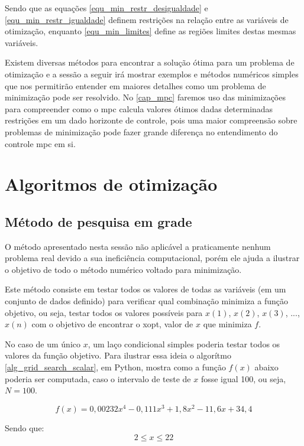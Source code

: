 Sendo que as equações \ref{equ_min_restr_desigualdade} e \ref{equ_min_restr_igualdade} definem restrições na relação entre as variáveis de otimização, enquanto \ref{equ_min_limites} define as regiões limites destas mesmas variáveis.

Existem diversas métodos para encontrar a solução ótima para um problema de otimização e a sessão a seguir irá mostrar exemplos e métodos numéricos simples que nos permitirão entender em maiores detalhes como um problema de minimização pode ser resolvido. No \autoref{cap_mpc} faremos uso das minimizações para compreender como o \acrshort{mpc} calcula valores ótimos dadas determinadas restrições em um dado horizonte de controle, pois uma maior compreensão sobre problemas de minimização pode fazer grande diferença no entendimento do controle \acrshort{mpc} em si.

\section{Algoritmos de otimização}

\subsection{Método de pesquisa em grade}

O método apresentado nesta sessão não aplicável a praticamente nenhum problema real devido a sua ineficiência computacional, porém ele ajuda a ilustrar o objetivo de todo o método numérico voltado para minimização.

Este método consiste em testar todos os valores de todas as variáveis (em um conjunto de dados definido) para verificar qual combinação minimiza a função objetivo, ou seja, testar todos os valores possíveis para $x(1)$, $x(2)$, $x(3)$, $...$, $x(n)$ com o objetivo de encontrar o \gls{xopt}, valor de $x$ que minimiza $f$.

No caso de um único $x$, um laço condicional simples poderia testar todos os valores da função objetivo. Para ilustrar essa ideia o algorítmo \ref{alg_grid_search_scalar}, em Python, mostra como a função $f(x)$ abaixo poderia ser computada, caso o intervalo de teste de $x$ fosse igual 100, ou seja, $N = 100$.

\begin{equation}
	\label{equ_grid_search_scalar}
	f(x) = 0,00232x^4 - 0,111x^3 + 1,8x^2 - 11,6x + 34,4
\end{equation}

Sendo que:
\[	2 \leq x \leq 22 \]

